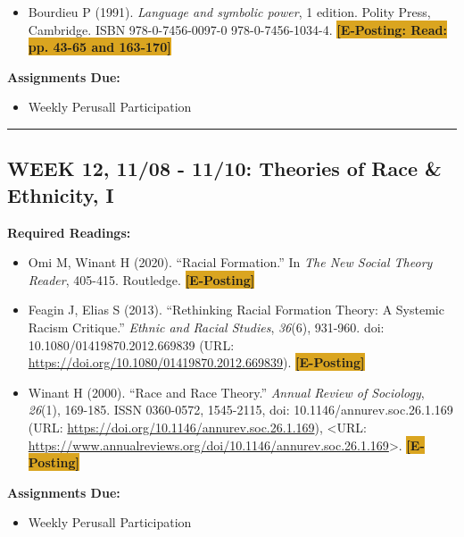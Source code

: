 \documentclass[11pt,]{article}
\providecommand{\tightlist}{%
  \setlength{\itemsep}{0pt}\setlength{\parskip}{0pt}}
\begin{document}
\begin{itemize}
\tightlist
\item
  Bourdieu P (1991). \emph{Language and symbolic power}, 1 edition.
  Polity Press, Cambridge. ISBN 978-0-7456-0097-0 978-0-7456-1034-4.
  \colorbox{Goldenrod}{\bf{[E-Posting: Read: pp. 43-65 and 163-170]}}
\end{itemize}

\textbf{Assignments Due:}

\begin{itemize}
\tightlist
\item
  Weekly Perusall Participation
\end{itemize}

\bigbreak
\hrule

\hypertarget{week-12-1108---1110-theories-of-race-ethnicity-i}{%
\subsection{WEEK 12, 11/08 - 11/10: Theories of Race \& Ethnicity,
I}\label{week-12-1108---1110-theories-of-race-ethnicity-i}}

\textbf{Required Readings:}

\begin{itemize}
\item
  Omi M, Winant H (2020). ``Racial Formation.'' In \emph{The New Social
  Theory Reader}, 405-415. Routledge.
  \colorbox{Goldenrod}{\bf{[E-Posting]}}
\item
  Feagin J, Elias S (2013). ``Rethinking Racial Formation Theory: A
  Systemic Racism Critique.'' \emph{Ethnic and Racial Studies},
  \emph{36}(6), 931-960. doi: 10.1080/01419870.2012.669839 (URL:
  \url{https://doi.org/10.1080/01419870.2012.669839}).
  \colorbox{Goldenrod}{\bf{[E-Posting]}}
\item
  Winant H (2000). ``Race and Race Theory.'' \emph{Annual Review of
  Sociology}, \emph{26}(1), 169-185. ISSN 0360-0572, 1545-2115, doi:
  10.1146/annurev.soc.26.1.169 (URL:
  \url{https://doi.org/10.1146/annurev.soc.26.1.169}), \textless URL:
  \url{https://www.annualreviews.org/doi/10.1146/annurev.soc.26.1.169}\textgreater.
  \colorbox{Goldenrod}{\bf{[E-Posting]}}
\end{itemize}

\textbf{Assignments Due:}

\begin{itemize}
\tightlist
\item
  Weekly Perusall Participation
\end{itemize}
\end{document}
